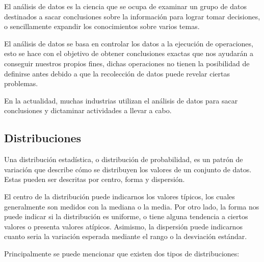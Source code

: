 El análisis de datos es la ciencia que se ocupa de examinar  un grupo de datos destinados a sacar conclusiones sobre la información para lograr tomar decisiones, o sencillamente expandir los conocimientos sobre varios temas.\par 

El análisis de datos se basa en controlar los datos a la ejecución de operaciones, esto se hace con el objetivo de obtener conclusiones exactas que nos ayudarán a conseguir nuestros propios fines, dichas operaciones no tienen la posibilidad de definirse antes debido a que la  recolección de datos puede revelar ciertas problemas.\par
 
 En la actualidad, muchas industrias utilizan el análisis de datos para sacar conclusiones y dictaminar actividades a llevar a cabo. \par
 
 \subsection{Distribuciones}
 Una distribución estadística, o distribución de probabilidad, es un patrón de variación que describe cómo se distribuyen los valores de un conjunto de datos. Estas pueden ser descritas por centro, forma y dispersión.\par
 
El centro de la distribución puede indicarnos los valores típicos, los cuales generalmente son medidos con la mediana o la media. Por otro lado, la forma nos puede indicar si la distribución es uniforme, o tiene alguna tendencia a ciertos valores o presenta valores atípicos. Asimismo, la dispersión puede indicarnos cuanto seria la variación esperada mediante el rango o la desviación estándar. \cite{Walpole_Myers_Myers_Ye_2013}\par
    
Principalmente se puede mencionar que existen dos tipos de distribuciones:

